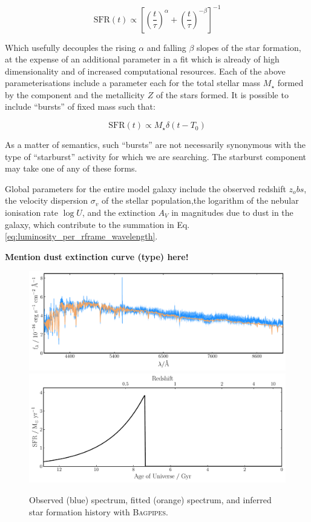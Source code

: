 \documentclass[a4paper,11pt]{article}
\begin{document}
\begin{equation}\label{eq:dblplaw_model}
  \mathrm{SFR}(t)\propto
  \left[
  \left(\frac{t}{\tau}\right)^{\alpha} +
  \left(\frac{t}{\tau}\right)^{-\beta}
  \right]
  ^{-1}
\end{equation}

\noindent Which usefully decouples the rising $\alpha$ and falling $\beta$ slopes of the star formation, at the expense of an additional parameter in a fit which is already of high dimensionality and of increased computational resources.\cite{Carnall_2018} Each of the above parameterisations include a parameter each for the total stellar mass $M_\star$ formed by the component and the metallicity $Z$ of the stars formed. It is possible to include ``bursts'' of fixed mass such that:

\begin{equation}
  \mathrm{SFR}(t)\propto
  M_\star \delta(t-T_0)
\end{equation}

\noindent As a matter of semantics, such ``bursts'' are not necessarily synonymous with the type of ``starburst'' activity for which we are searching. The starburst component may take one of any of these forms.

Global parameters for the entire model galaxy include the observed redshift $z_obs$, the velocity dispersion $\sigma_v$ of the stellar population,the logarithm of the nebular ionisation rate $\log{U}$, and the extinction $A_V$ in magnitudes due to dust in the galaxy, which contribute to the summation in Eq. \ref{eq:luminosity_per_rframe_wavelength}.

\textbf{Mention dust extinction curve (type) here!}

\begin{figure}
  \includegraphics[width=\textwidth]{host_hyz_specwerr_fit}
  \includegraphics[width=\textwidth]{host_hyz_specwerr_sfh}
  \caption{Observed (blue) spectrum, fitted (orange) spectrum, and inferred star formation history with \textsc{Bagpipes}.}
  \label{fig:bagpipes_example_fit}
\end{figure}
\end{document}
